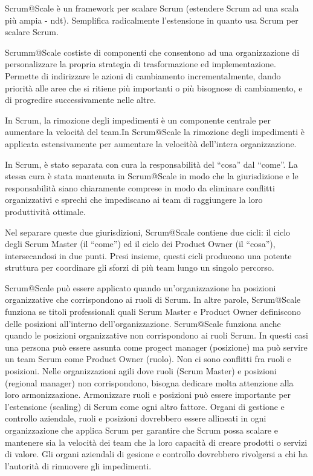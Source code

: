 \documentclass[italian,12pt,a4paper,parskip=full]{scrartcl}
\begin{document}
Scrum@Scale è un framework per scalare Scrum (estendere Scrum ad una scala più ampia - ndt). Semplifica radicalmente l'estensione in quanto usa Scrum per scalare Scrum.

Scrumm@Scale costiste di componenti che consentono ad una organizzazione di personalizzare la propria strategia di trasformazione ed implementazione. Permette di indirizzare le azioni di cambiamento incrementalmente, dando priorità alle aree che si ritiene più importanti o più bisognose di cambiamento, e di progredire successivamente nelle altre.

In Scrum, la rimozione degli impedimenti è un componente centrale per aumentare la velocità del team.In Scrum@Scale la rimozione degli impedimenti è applicata estensivamente per aumentare la velocitòà dell'intera organizzazione.

In Scrum, è stato separata con cura la responsabilità del ``cosa'' dal ``come''.
La stessa cura è stata mantenuta in Scrum@Scale in modo che la giurisdizione e le responsabilità siano chiaramente comprese in modo da eliminare conflitti organizzativi e sprechi che impediscano ai team di raggiungere la loro produttività ottimale.

Nel separare queste due giurisdizioni, Scrum@Scale contiene due cicli: il ciclo degli Scrum Master (il ``come'') ed il ciclo dei Product Owner (il ``cosa''), intersecandosi in due punti. Presi insieme, questi cicli producono una potente struttura per coordinare gli sforzi di più team lungo un singolo percorso.

Scrum@Scale può essere applicato quando un'organizzazione ha posizioni organizzative che corrispondono ai ruoli di Scrum. In altre parole, Scrum@Scale funziona se titoli professionali quali Scrum Master e Product Owner definiscono delle posizioni all'interno dell'organizzazione. Scrum@Scale funziona anche quando le posizioni organizzative non corrispondono ai ruoli Scrum. In questi casi una persona può essere assunta come progect manager (posizione) ma può servire un team Scrum come Product Owner (ruolo). Non ci sono conflitti fra ruoli e posizioni. Nelle organizzazioni agili dove ruoli (Scrum Master) e posizioni (regional manager) non corrispondono, bisogna dedicare molta attenzione alla loro armonizzazione. Armonizzare ruoli e posizioni può essere importante per l'estensione (scaling) di Scrum come ogni altro fattore. Organi di gestione e controllo aziendale, ruoli e posizioni dovrebbero essere allineati in ogni organizzazione che applica Scrum per garantire che Scrum possa scalare e mantenere sia la velocità dei team che la loro capacità di creare prodotti o servizi di valore. Gli organi aziendali di gesione e controllo dovrebbero rivolgersi a chi ha l'autorità di rimuovere gli impedimenti.
\end{document}
